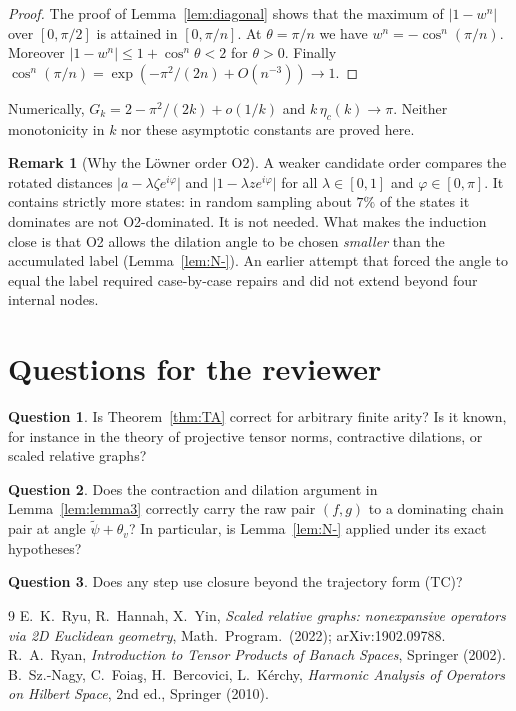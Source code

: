 \documentclass[11pt]{amsart}
\theoremstyle{definition}
\newtheorem*{remark}{Remark}
\newtheorem{question}{Question}
\newcommand{\abs}[1]{\lvert #1\rvert}
\begin{document}
\begin{proof}
The proof of Lemma~\ref{lem:diagonal} shows that the maximum of $\abs{1-w^n}$ over
$[0,\pi/2]$ is attained in $[0,\pi/n]$. At $\theta=\pi/n$ we have
$w^n=-\cos^n(\pi/n)$. Moreover $\abs{1-w^n}\le1+\cos^n\theta<2$ for $\theta>0$. Finally
$\cos^n(\pi/n)=\exp(-\pi^2/(2n)+O(n^{-3}))\to1$.
\end{proof}

Numerically, $G_k=2-\pi^2/(2k)+o(1/k)$ and $k\,\eta_c(k)\to\pi$. Neither monotonicity
in $k$ nor these asymptotic constants are proved here.

\begin{remark}[Why the Löwner order O2]
A weaker candidate order compares the rotated distances
$\abs{a-\lambda\zeta e^{i\varphi}}$ and $\abs{1-\lambda ze^{i\varphi}}$ for all
$\lambda\in[0,1]$ and $\varphi\in[0,\pi]$. It contains strictly more states: in random
sampling about $7\%$ of the states it dominates are not O2-dominated. It is not
needed. What makes the induction close is that O2 allows the dilation angle to be
chosen \emph{smaller} than the accumulated label (Lemma~\ref{lem:N-}). An earlier
attempt that forced the angle to equal the label required case-by-case repairs and
did not extend beyond four internal nodes.
\end{remark}

\section*{Questions for the reviewer}

\begin{question}
Is Theorem~\ref{thm:TA} correct for arbitrary finite arity? Is it known, for
instance in the theory of projective tensor norms, contractive dilations, or
scaled relative graphs?
\end{question}

\begin{question}
Does the contraction and dilation argument in Lemma~\ref{lem:lemma3} correctly carry
the raw pair $(f,g)$ to a dominating chain pair at angle $\tilde\psi+\theta_v$? In
particular, is Lemma~\ref{lem:N-} applied under its exact hypotheses?
\end{question}

\begin{question}
Does any step use closure beyond the trajectory form (TC)?
\end{question}

\begin{thebibliography}{9}
 E.~K.~Ryu, R.~Hannah, X.~Yin, \emph{Scaled relative graphs: nonexpansive operators via 2D Euclidean geometry}, Math.\ Program.\ (2022); arXiv:1902.09788.
 R.~A.~Ryan, \emph{Introduction to Tensor Products of Banach Spaces}, Springer (2002).
 B.~Sz.-Nagy, C.~Foia\c{s}, H.~Bercovici, L.~K\'erchy, \emph{Harmonic Analysis of Operators on Hilbert Space}, 2nd ed., Springer (2010).
\end{thebibliography}
\end{document}
